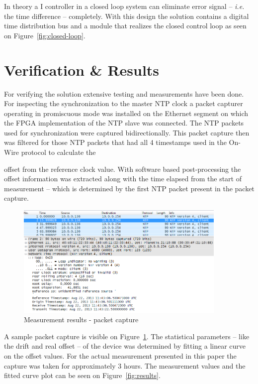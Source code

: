 \documentclass[article]{IEEEtran}
\begin{document}
In theory a I controller in a closed loop system can eliminate error signal -- \emph{i.e.} the time difference --
completely.
With this design the solution contains a digital time distribution bus and a module that realizes the
closed control loop as seen on Figure~\ref{fig:closed-loop}.

\section{Verification \& Results}


For verifying the solution extensive testing and measurements have been done. For inspecting the synchronization
to the master NTP clock a packet capturer operating in promiscuous mode was installed on the Ethernet segment on which
the FPGA implementation
of the NTP slave was connected. The NTP packets used for synchronization were captured bidirectionally. This packet
capture then was filtered for those NTP packets that had all 4 timestamps used in the On-Wire protocol to calculate the

offset from the reference clock value. With software based post-processing the offset information was extracted along
with the time elapsed from
the start of measurement -- which is determined by the first NTP packet present in the packet capture.

\begin{figure}[!htb]
    \centering
    \includegraphics[width=0.9\textwidth]{figures_raw/pcap-NTP.png}
    \caption{Measurement results - packet capture}
    \label{fig:pcap-NTP}
\end{figure}

A sample packet capture is visible on Figure~\ref{fig:pcap-NTP}. The statistical parameters -- like the drift and real
offset -- of the device was determined by
fitting a linear curve on the offset values. For the actual measurement presented in this paper the capture was taken
for approximately 3 hours.
The measurement values and the fitted curve plot can be seen on Figure~\ref{fig:results}.
\end{document}
